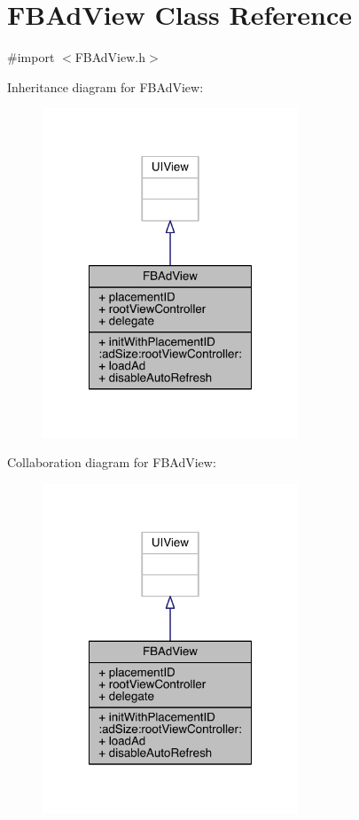 \hypertarget{interface_f_b_ad_view}{\section{F\-B\-Ad\-View Class Reference}
\label{interface_f_b_ad_view}
}


{\ttfamily \#import $<$F\-B\-Ad\-View.\-h$>$}



Inheritance diagram for F\-B\-Ad\-View\-:
\nopagebreak
\begin{figure}[H]
\begin{center}
\leavevmode
\includegraphics[width=216pt]{interface_f_b_ad_view__inherit__graph}
\end{center}
\end{figure}


Collaboration diagram for F\-B\-Ad\-View\-:
\nopagebreak
\begin{figure}[H]
\begin{center}
\leavevmode
\includegraphics[width=216pt]{interface_f_b_ad_view__coll__graph}
\end{center}
\end{figure}
